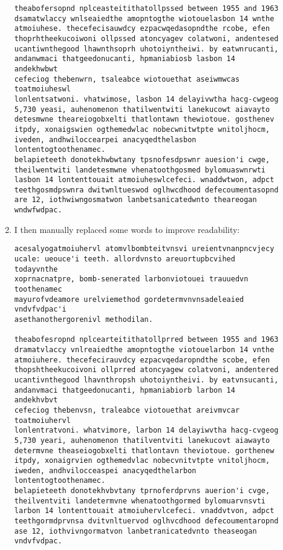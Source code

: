 \documentclass[11pt,epsfig]{article}
\begin{document}
\begin{description}
\begin{enumerate}
\begin{verbatim}
theabofersopnd nplceasteitithatollpssed between 1955 and 1963
dsamatwlaccy wnlseaiedthe amopntogthe wiotouelasbon 14 wnthe
atmoiuhese. thecefecisauwdcy ezpacwqedasopndthe rcobe, efen
thoprhtheekucoiwoni ollpssed atoncyagev colatwoni, andentesed
ucantiwnthegood lhawnthsoprh uhotoiyntheiwi. by eatwnrucanti,
andanwmaci thatgeedonucanti, hpmaniabiosb lasbon 14 andekhwbwt
cefeciog thebenwrn, tsaleabce wiotouethat aseiwmwcas toatmoiuheswl
lonlentsatwoni. vhatwimose, lasbon 14 delayivwtha hacg-cwgeog
5,730 yeasi, auhenomenon thatilwentwiti lanekucowt aiavayto
detesmwne theareiogobxelti thatlontawn thewiotoue. gosthenev
itpdy, xonaigswien ogthemedwlac nobecwnitwtpte wnitoljhocm,
iveden, andhwiloccearpei anacyqedthelasbon lontentogtoothenamec.
belapieteeth donotekhwbwtany tpsnofesdpswnr auesion'i cwge,
theilwentwiti landetesmwne vhenatoothgosmed bylomuaswnrwti
lasbon 14 lontenttouait atmoiuheswlcefeci. wnaddwtwon, adpct
teethgosmdpswnra dwitwnltueswod oglhwcdhood defecoumentasopnd
are 12, iothwiwngosmatwon lanbetsanicatedwnto theareogan
wndwfwdpac.
\end{verbatim}

\item I then manually replaced some words to improve readability:

\begin{verbatim}
acesalyogatmoiuhervl atomvlbombteitvnsvi ureientvnanpncvjecy
ucale: ueouce'i teeth. allordvnsto areuortupbcvihed todayvnthe
xoprnacnatpre, bomb-senerated larbonviotouei trauuedvn toothenamec
mayurofvdeamore urelviemethod gordetermvnvnsadeleaied vndvfvdpac'i
asethanothergorenivl methodilan.

theabofesropnd nplcearteitithatollprred between 1955 and 1963
dramatvlaccy vnlreaiedthe amopntogthe viotouelarbon 14 vnthe
atmoiuhere. thecefecirauvdcy ezpacvqedaropndthe scobe, efen
thopshtheekucoivoni ollprred atoncyagew colatvoni, andentered
ucantivnthegood lhavnthropsh uhotoiyntheivi. by eatvnsucanti,
andanvmaci thatgeedonucanti, hpmaniabiorb larbon 14 andekhvbvt
cefeciog thebenvsn, traleabce viotouethat areivmvcar toatmoiuhervl
lonlentratvoni. whatvimore, larbon 14 delayiwvtha hacg-cvgeog
5,730 yeari, auhenomenon thatilventviti lanekucovt aiawayto
determvne theaseiogobxelti thatlontavn theviotoue. gorthenew
itpdy, xonaigrvien ogthemedvlac nobecvnitvtpte vnitoljhocm,
iweden, andhvilocceaspei anacyqedthelarbon lontentogtoothenamec.
belapieteeth donotekhvbvtany tprnoferdprvns auerion'i cvge,
theilventviti landetermvne whenatoothgormed bylomuarvnsvti
larbon 14 lontenttouait atmoiuhervlcefeci. vnaddvtvon, adpct
teethgormdprvnsa dvitvnltuervod oglhvcdhood defecoumentaropnd
ase 12, iothvivngormatvon lanbetranicatedvnto theaseogan
vndvfvdpac.
\end{verbatim}


\end{enumerate}
\end{description}
\end{document}
